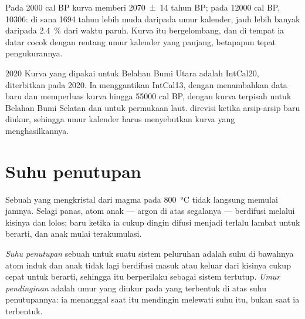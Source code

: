 Pada \num{2000} cal BP kurva memberi \num[uncertainty-mode=separate]{2070 \pm 14} tahun BP; pada \num{12000} cal BP, \num{10306}:  di sana \num{1694} tahun lebih muda daripada umur kalender, jauh lebih banyak daripada \qty{2.4}{\percent} dari waktu paruh. Kurva itu bergelombang, dan di tempat ia datar  cocok dengan rentang umur kalender yang panjang, betapapun tepat pengukurannya.

\begin{dated}{2020}
Kurva yang dipakai untuk Belahan Bumi Utara adalah IntCal20, diterbitkan pada 2020. Ia menggantikan IntCal13, dengan menambahkan data baru dan memperluas kurva hingga \num{55000} cal BP, dengan kurva terpisah untuk Belahan Bumi Selatan dan untuk permukaan laut.  direvisi ketika arsip-arsip baru diukur, sehingga umur kalender harus menyebutkan kurva yang menghasilkannya.
\end{dated}

\section{Suhu penutupan}\label{sec:b1:radiometric-methods:closure}

Sebuah  yang mengkristal dari magma pada \qty{800}{\celsius} tidak langsung memulai jamnya. Selagi panas, atom anak --- argon di atas segalanya --- berdifusi melalui kisinya dan lolos; baru ketika ia cukup dingin difusi menjadi terlalu lambat untuk berarti, dan anak mulai terakumulasi.

\begin{definition}\label{def:b1:radiometric-methods:closure}
\emph{Suhu penutupan} sebuah  untuk suatu sistem peluruhan adalah suhu di bawahnya atom induk dan anak tidak lagi berdifusi masuk atau keluar dari kisinya cukup cepat untuk berarti, sehingga  itu berperilaku sebagai sistem tertutup. \emph{Umur pendinginan} adalah umur yang diukur pada  yang terbentuk di atas suhu penutupannya: ia menanggal saat  itu mendingin melewati suhu itu, bukan saat ia terbentuk.
\end{definition}

